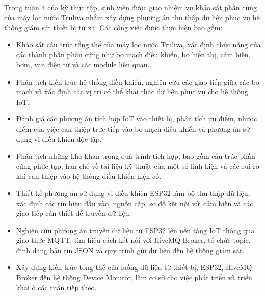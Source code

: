 

Trong tuần 4 của kỳ thực tập, sinh viên được giao nhiệm vụ khảo sát phần cứng của máy lọc nước Truliva nhằm xây dựng phương án thu thập dữ liệu phục vụ hệ thống giám sát thiết bị từ xa. Các công việc được thực hiện bao gồm:

\begin{itemize}
    \item Khảo sát cấu trúc tổng thể của máy lọc nước Truliva, xác định chức năng của các thành phần phần cứng như bo mạch điều khiển, bo hiển thị, cảm biến, bơm, van điện từ và các module liên quan.
    
    \item Phân tích kiến trúc hệ thống điều khiển, nghiên cứu các giao tiếp giữa các bo mạch và xác định các vị trí có thể khai thác dữ liệu phục vụ cho hệ thống IoT.
    
    \item Đánh giá các phương án tích hợp IoT vào thiết bị, phân tích ưu điểm, nhược điểm của việc can thiệp trực tiếp vào bo mạch điều khiển và phương án sử dụng vi điều khiển độc lập.
    
    \item Phân tích những khó khăn trong quá trình tích hợp, bao gồm cấu trúc phần cứng phức tạp, hạn chế về tài liệu kỹ thuật của một số linh kiện và các rủi ro khi can thiệp vào hệ thống điều khiển hiện có.
    
    \item Thiết kế phương án sử dụng vi điều khiển ESP32 làm bộ thu thập dữ liệu, xác định các tín hiệu đầu vào, nguồn cấp, sơ đồ kết nối với cảm biến và các giao tiếp cần thiết để truyền dữ liệu.
    
    \item Nghiên cứu phương án truyền dữ liệu từ ESP32 lên nền tảng IoT thông qua giao thức MQTT, tìm hiểu cách kết nối với HiveMQ Broker, tổ chức topic, định dạng bản tin JSON và quy trình gửi dữ liệu đến hệ thống giám sát.
    
    \item Xây dựng kiến trúc tổng thể của luồng dữ liệu từ thiết bị, ESP32, HiveMQ Broker đến hệ thống Device Monitor, làm cơ sở cho việc phát triển và triển khai ở các tuần tiếp theo.
\end{itemize}




